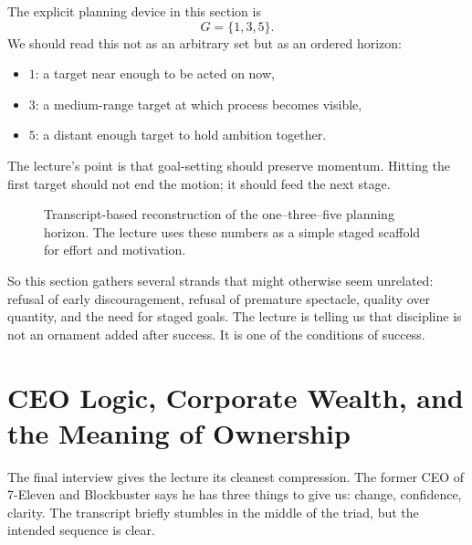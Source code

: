 The explicit planning device in this section is
\begin{equation}
G=\{1,3,5\}.
\end{equation}
We should read this not as an arbitrary set but as an ordered horizon:
\begin{itemize}
\item \(1\): a target near enough to be acted on now,
\item \(3\): a medium-range target at which process becomes visible,
\item \(5\): a distant enough target to hold ambition together.
\end{itemize}
The lecture's point is that goal-setting should preserve momentum. Hitting the first target should not end the motion; it should feed the next stage.

\begin{figure}[h]
\centering
{}
\caption{Transcript-based reconstruction of the one--three--five planning horizon. The lecture uses these numbers as a simple staged scaffold for effort and motivation.}
\end{figure}

So this section gathers several strands that might otherwise seem unrelated: refusal of early discouragement, refusal of premature spectacle, quality over quantity, and the need for staged goals. The lecture is telling us that discipline is not an ornament added after success. It is one of the conditions of success.

\section{CEO Logic, Corporate Wealth, and the Meaning of Ownership}

The final interview gives the lecture its cleanest compression. The former CEO of 7-Eleven and Blockbuster says he has three things to give us: change, confidence, clarity. The transcript briefly stumbles in the middle of the triad, but the intended sequence is clear.

